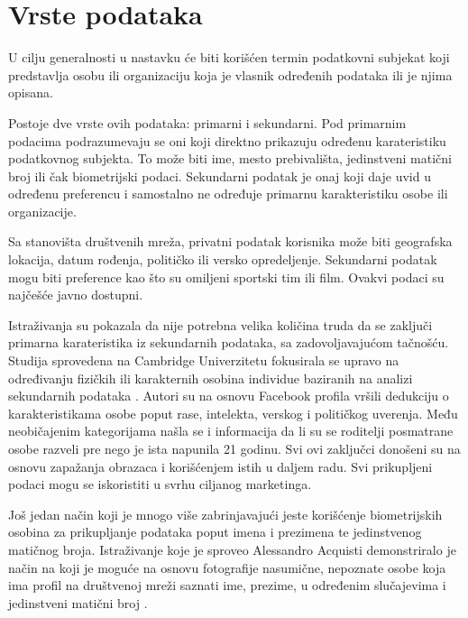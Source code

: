 \documentclass[a4paper]{article}
\begin{document}
\section{Vrste podataka}
U cilju generalnosti u nastavku će biti korišćen termin podatkovni subjekat koji predstavlja osobu ili organizaciju koja je vlasnik određenih podataka ili je njima opisana.\par Postoje dve vrste ovih podataka: primarni i sekundarni. Pod primarnim podacima podrazumevaju se oni koji direktno prikazuju određenu karateristiku podatkovnog subjekta. To može biti ime, mesto prebivališta, jedinstveni matični broj ili čak biometrijski podaci. Sekundarni podatak je onaj koji daje uvid u određenu preferencu i samostalno ne određuje primarnu karakteristiku osobe ili organizacije. \par Sa stanovišta društvenih mreža, privatni podatak korisnika može biti geografska lokacija, datum rođenja, političko ili versko opredeljenje. Sekundarni podatak mogu biti preference kao što su omiljeni sportski tim ili film. Ovakvi podaci su najčešće javno dostupni. \par Istraživanja su pokazala da nije potrebna velika količina truda da se zaključi primarna karateristika iz sekundarnih podataka, sa zadovoljavajućom tačnošću. Studija sprovedena na Cambridge Univerzitetu fokusirala se upravo na određivanju fizičkih ili karakternih osobina individue baziranih na analizi sekundarnih podataka \cite{Kosinskia}. Autori su na osnovu Facebook profila vršili dedukciju o karakteristikama osobe poput rase, intelekta, verskog i političkog uverenja. Među neobičajenim
kategorijama našla se i informacija da li su se roditelji posmatrane osobe razveli pre nego je ista napunila 21 godinu. Svi ovi zaključci donošeni su na osnovu zapažanja obrazaca i korišćenjem istih u daljem radu. Svi prikupljeni podaci mogu se iskoristiti u svrhu ciljanog marketinga. \par Još jedan način koji je mnogo više zabrinjavajući jeste korišćenje biometrijskih osobina za prikupljanje podataka poput
imena i prezimena te jedinstvenog matičnog broja. Istraživanje koje je sproveo Alessandro Acquisti demonstriralo je način na koji je moguće na osnovu fotografije nasumične, nepoznate osobe koja ima profil na društvenoj mreži saznati ime, prezime, u određenim slučajevima i jedinstveni matični broj \cite{Acquisti}. 
\newpage
\end{document}
